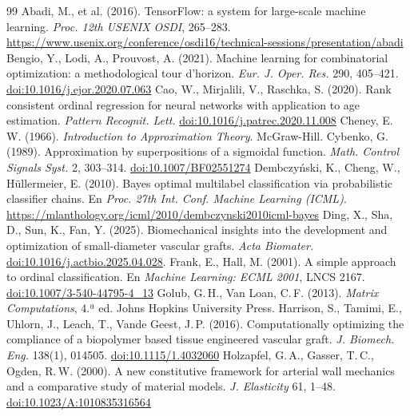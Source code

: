 \begin{thebibliography}{99}\footnotesize\setlength{\itemsep}{0pt}
 Abadi, M., et al. (2016). TensorFlow: a system for large-scale machine learning. \emph{Proc. 12th USENIX OSDI}, 265--283. \url{https://www.usenix.org/conference/osdi16/technical-sessions/presentation/abadi}
 Bengio, Y., Lodi, A., Prouvost, A. (2021). Machine learning for combinatorial optimization: a methodological tour d'horizon. \emph{Eur. J. Oper. Res.} 290, 405--421. \href{https://doi.org/10.1016/j.ejor.2020.07.063}{doi:10.1016/j.ejor.2020.07.063}
 Cao, W., Mirjalili, V., Raschka, S. (2020). Rank consistent ordinal regression for neural networks with application to age estimation. \emph{Pattern Recognit. Lett.} \href{https://doi.org/10.1016/j.patrec.2020.11.008}{doi:10.1016/j.patrec.2020.11.008}
 Cheney, E.\,W. (1966). \emph{Introduction to Approximation Theory}. McGraw-Hill.
 Cybenko, G. (1989). Approximation by superpositions of a sigmoidal function. \emph{Math. Control Signals Syst.} 2, 303--314. \href{https://doi.org/10.1007/BF02551274}{doi:10.1007/BF02551274}
 Dembczy\'nski, K., Cheng, W., Hüllermeier, E. (2010). Bayes optimal multilabel classification via probabilistic classifier chains. En \emph{Proc. 27th Int. Conf. Machine Learning (ICML)}. \url{https://mlanthology.org/icml/2010/dembczynski2010icml-bayes}
 Ding, X., Sha, D., Sun, K., Fan, Y. (2025). Biomechanical insights into the development and optimization of small-diameter vascular grafts. \emph{Acta Biomater.} \href{https://doi.org/10.1016/j.actbio.2025.04.028}{doi:10.1016/j.actbio.2025.04.028}.
 Frank, E., Hall, M. (2001). A simple approach to ordinal classification. En \emph{Machine Learning: ECML 2001}, LNCS 2167. \href{https://doi.org/10.1007/3-540-44795-4_13}{doi:10.1007/3-540-44795-4\_13}
 Golub, G.\,H., Van Loan, C.\,F. (2013). \emph{Matrix Computations}, 4.ª ed. Johns Hopkins University Press.
 Harrison, S., Tamimi, E., Uhlorn, J., Leach, T., Vande Geest, J.\,P. (2016). Computationally optimizing the compliance of a biopolymer based tissue engineered vascular graft. \emph{J. Biomech. Eng.} 138(1), 014505. \href{https://doi.org/10.1115/1.4032060}{doi:10.1115/1.4032060}
 Holzapfel, G.\,A., Gasser, T.\,C., Ogden, R.\,W. (2000). A new constitutive framework for arterial wall mechanics and a comparative study of material models. \emph{J. Elasticity} 61, 1--48. \href{https://doi.org/10.1023/A:1010835316564}{doi:10.1023/A:1010835316564}

\end{thebibliography}
